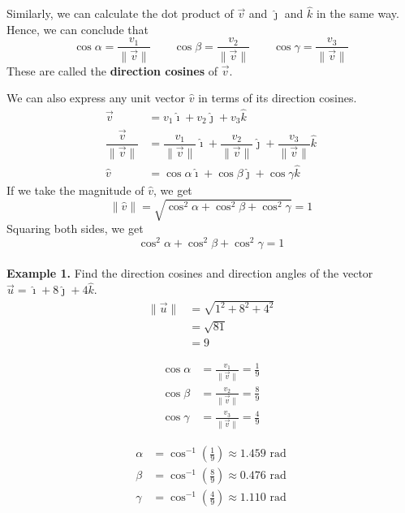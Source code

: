 \documentclass{report}
\begin{document}
Similarly, we can calculate the dot product of $\vec{v}$ and $\hat{\jmath}$ and
$\hat{k}$ in the same way. Hence, we can conclude that \[\cos\alpha = \frac{v_1}{\lVert \vec{v} \rVert} \qquad \cos\beta = \frac{v_2}{\lVert \vec{v} \rVert} \qquad \cos\gamma = \frac{v_3}{\lVert \vec{v} \rVert}\]
These are called the \textbf{direction cosines} of $\vec{v}$.

We can also express any unit vector $\hat{v}$ in terms of its direction
cosines.
\begin{align*}
    \vec{v}                                & = v_1\hat{\imath} + v_2\hat{\jmath} + v_3\hat{k}                                                                                              \\
    \dfrac{\vec{v}}{\lVert \vec{v} \rVert} & = \dfrac{v_1}{\lVert \vec{v} \rVert}\hat{\imath} + \dfrac{v_2}{\lVert \vec{v} \rVert}\hat{\jmath} + \dfrac{v_3}{\lVert \vec{v} \rVert}\hat{k} \\
    \hat{v}                                & = \cos\alpha\hat{\imath} + \cos\beta\hat{\jmath} + \cos\gamma\hat{k}
\end{align*}
If we take the magnitude of $\hat{v}$, we get \[\lVert \hat{v} \rVert = \sqrt{\cos^2\alpha + \cos^2\beta + \cos^2\gamma} = 1\] Squaring both sides, we get \[\cos^2\alpha + \cos^2\beta + \cos^2\gamma = 1\]
~\\
\noindent\textbf{Example 1. } Find the direction cosines and direction angles of the vector $\vec{u} = \hat{\imath} + 8\hat{\jmath} + 4\hat{k}$.
\begin{align*}
    \lVert \vec{u} \rVert & = \sqrt{1^2 + 8^2 + 4^2} \\
                          & = \sqrt{81}              \\
                          & = 9
\end{align*}
\vspace{-5em}
\begin{multicols}{2}
    \begin{align*}
        \cos\alpha & = \frac{v_1}{\lVert \vec{v} \rVert} = \frac{1}{9} \\
        \cos\beta  & = \frac{v_2}{\lVert \vec{v} \rVert} = \frac{8}{9} \\
        \cos\gamma & = \frac{v_3}{\lVert \vec{v} \rVert} = \frac{4}{9}
    \end{align*}

    \begin{align*}
        \alpha & = \cos^{-1}\left(\frac{1}{9}\right) \approx 1.459 \text{ rad} \\
        \beta  & = \cos^{-1}\left(\frac{8}{9}\right) \approx 0.476 \text{ rad} \\
        \gamma & = \cos^{-1}\left(\frac{4}{9}\right) \approx 1.110 \text{ rad}
    \end{align*}
\end{multicols}
\end{document}
